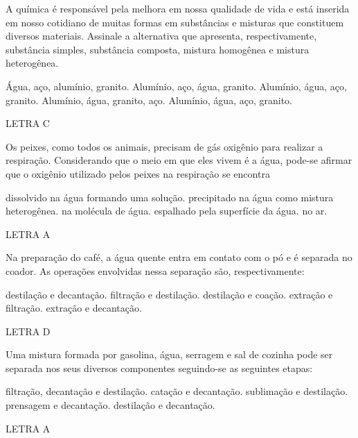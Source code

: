 \documentclass[9 pt]{scrartcl}
\def\PQ{0.84} %
\begin{document}
\begin{exercise}[points=\PQ]
A química é responsável pela melhora em nossa qualidade de vida e está inserida em nosso cotidiano de muitas  formas em substâncias e misturas que constituem diversos materiais. Assinale  a  alternativa  que  apresenta,  respectivamente,  substância  simples,  substância  composta,  mistura homogênea e mistura heterogênea.

\begin{choice}
\choice Água, aço, alumínio, granito.
\choice Alumínio, aço, água, granito.
\choice Alumínio, água, aço, granito.
\choice  Alumínio, água, granito, aço.
\choice  Alumínio, água, aço, granito.
\end{choice}
\end{exercise}
\begin{solution}
LETRA C
\end{solution}



\begin{exercise}[points=\PQ]
Os  peixes,  como  todos  os  animais,  precisam  de  gás  oxigênio  para  realizar  a respiração. Considerando que o meio em que eles vivem é a água, pode-se afirmar que o oxigênio utilizado pelos peixes na respiração se encontra
\begin{choice}
\choice dissolvido na água formando uma solução.
\choice precipitado na água como mistura heterogênea.
\choice na molécula de água.
\choice espalhado pela superfície da água.
\choice no ar.
\end{choice}
\end{exercise}
\begin{solution}
LETRA A
\end{solution}

\begin{exercise}[points=\PQ]
Na preparação do café, a água quente entra em contato com o pó e é separada no coador. As operações envolvidas nessa separação são, respectivamente:
\begin{choice}
\choice destilação e decantação.
\choice  filtração e destilação.
\choice  destilação e coação.
\choice  extração e filtração.
\choice  extração e decantação.
\end{choice}
\end{exercise}
\begin{solution}
LETRA D
\end{solution}

\begin{exercise}[points=\PQ]
Uma mistura formada por gasolina, água, serragem e sal de cozinha pode ser separada nos seus diversos componentes seguindo-se as seguintes etapas:
\begin{choice}
\choice filtração, decantação e destilação.
\choice catação e decantação.
\choice sublimação e destilação.
\choice prensagem e decantação.
\choice destilação e decantação.
\end{choice}
\end{exercise}
\begin{solution}
LETRA A
\end{solution}
\end{document}
